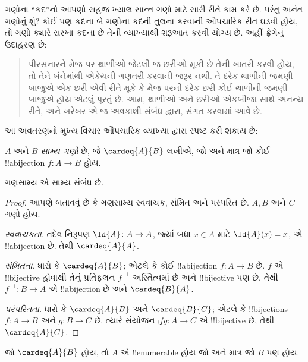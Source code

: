 \documentclass[../../../include/open-logic-section]{subfiles}
\begin{document}


ગણોના ``કદ''નો આપણો સહજ ખ્યાલ સાન્ત ગણો માટે સારી રીતે
કામ કરે છે. પરંતુ અનંત ગણોનું શું? કોઈ પણ કદના બે ગણોના કદની
તુલના કરવાની ઔપચારિક રીત ઘડવી હોય, તો ગણો ક્યારે સરખા કદના છે
તેની વ્યાખ્યાથી શરૂઆત કરવી યોગ્ય છે. અહીં ફ્રેગેનું ઉદાહરણ છે:
\begin{quote}
  પીરસનારને મેજ પર થાળીઓ જેટલી જ છરીઓ મૂકી છે તેની ખાતરી કરવી
  હોય, તો તેને બંનેમાંથી એકેયની ગણતરી કરવાની જરૂર નથી. તે દરેક
  થાળીની જમણી બાજુએ એક છરી એવી રીતે મૂકે કે મેજ પરની દરેક છરી
  કોઈ થાળીની જમણી બાજુએ હોય એટલું પૂરતું છે. આમ, થાળીઓ અને
  છરીઓ એકબીજા સાથે અનન્ય રીતે, અને ખરેખર એ જ અવકાશી સંબંધ
  દ્વારા, સંગત કરવામાં આવે છે. \citep[\S70]{Frege1884}
\end{quote}
આ અવતરણનો મુખ્ય વિચાર ઔપચારિક વ્યાખ્યા દ્વારા સ્પષ્ટ કરી શકાય છે:

\begin{defn}
  $A$ અને $B$ \emph{સામ્ય ગણો} છે, જે $\cardeq{A}{B}$ લખીએ,
  જો અને માત્ર જો કોઈ !!a{bijection} $f \colon A \to B$ હોય.
\end{defn}

\begin{prop}
ગણસામ્ય એ સામ્ય સંબંધ છે.
\end{prop}

\begin{proof}
આપણે બતાવવું છે કે ગણસામ્ય સ્વવાચક, સંમિત અને પરંપરિત છે.
$A, B$ અને $C$ ગણો હોય.

\emph{સ્વવાચકતા.} તદેવ નિરૂપણ $\Id{A} \colon A \to A$, જ્યાં
બધા $x \in A$ માટે $\Id{A} (x) = x$, એ !!a{bijection} છે.
તેથી $\cardeq{A}{A}$.

\emph{સંમિતતા.} ધારો કે $\cardeq{A}{B}$; એટલે કે કોઈ
!!a{bijection} $f\colon A \to B$ છે. $f$ એ !!{bijective} હોવાથી
તેનું પ્રતિફલન $f^{-1}$ અસ્તિત્વમાં છે અને !!{bijective} પણ છે.
તેથી $f^{-1}\colon B \to A$ એ !!a{bijection} છે અને
$\cardeq{B}{A}$.

\emph{પરંપરિતતા.} ધારો કે $\cardeq{A}{B}$ અને $\cardeq{B}{C}$;
એટલે કે !!{bijection}s $f\colon A \to B$ અને $g\colon B \to
C$ છે. ત્યારે સંયોજન $\comp{f}{g}\colon A \to C$ એ !!{bijective}
છે, તેથી $\cardeq{A}{C}$.
\end{proof}

\begin{prop}
જો $\cardeq{A}{B}$ હોય, તો $A$ એ !!{enumerable} હોય જો અને
માત્ર જો $B$ પણ હોય.
\end{prop}
\end{document}
